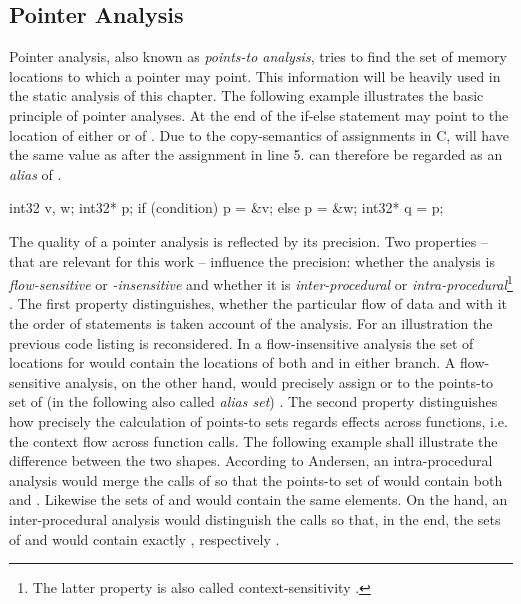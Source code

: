 \subsection{Pointer Analysis}
Pointer analysis, also known as \textit{points-to analysis}, tries to find the set of memory locations to which a pointer may point\cite{PointerAnalysisForStructuredParallelPrograms}. This information will be heavily used in the static analysis of this chapter. The following example illustrates the basic principle of pointer analyses. At the end of the if-else statement  may point to the location of either  or of . Due to the copy-semantics of assignments in C,  will have the same value as  after the assignment in line 5.  can therefore be regarded as an \textit{alias} of .
\begin{ccode}
int32 v, w;
int32* p;
if (condition)  p = &v;
else            p = &w; 
int32* q = p;
\end{ccode}
The quality of a pointer analysis is reflected by its precision. Two properties -- that are relevant for this work -- influence the precision: whether the analysis is \textit{flow-sensitive} or \textit{-insensitive} and whether it is \textit{inter-procedural} or \textit{intra-procedural}\footnote{The latter property is also called context-sensitivity \cite{CloningBasedContextSensitive}.} \cite{ProgramAnalysisAndSpecialization}. The first property distinguishes, whether the particular flow of data and with it the order of statements is taken account of the analysis. For an illustration the previous code listing is reconsidered. In a flow-insensitive analysis the set of locations for  would contain the locations of both  and  in either branch. A flow-sensitive analysis, on the other hand, would precisely assign  or  to the points-to set of (in the following also called \textit{alias set}) . The second property distinguishes how precisely the calculation of points-to sets regards effects across functions, i.e. the context flow across function calls. The following example shall illustrate the difference between the two shapes. According to Andersen, an intra-procedural analysis would merge the calls of  so that the points-to set of  would contain both  and . Likewise the sets of  and  would contain the same elements. On the hand, an inter-procedural analysis would distinguish the calls so that, in the end, the sets of  and  would contain exactly , respectively .
